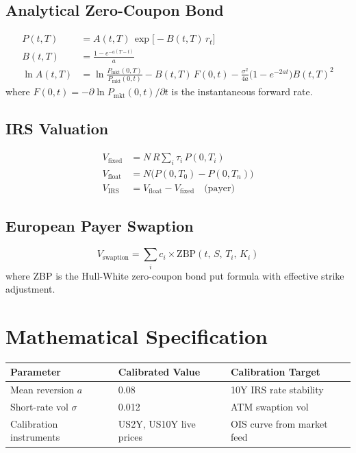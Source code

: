 \documentclass{apex_mdd}
\begin{document}
\subsection{Analytical Zero-Coupon Bond}
\begin{formulabox}
\begin{align*}
  P(t,T) &= A(t,T)\,\exp\!\bigl[-B(t,T)\,r_t\bigr]\\[4pt]
  B(t,T) &= \frac{1 - e^{-a(T-t)}}{a}\\[4pt]
  \ln A(t,T) &= \ln\frac{P_{\mathrm{mkt}}(0,T)}{P_{\mathrm{mkt}}(0,t)} - B(t,T)\,F(0,t) - \frac{\sigma^2}{4a}\bigl(1 - e^{-2at}\bigr)B(t,T)^2
\end{align*}
where $F(0,t) = -\partial\ln P_{\mathrm{mkt}}(0,t)/\partial t$ is the instantaneous forward rate.
\end{formulabox}

\subsection{IRS Valuation}
\begin{formulabox}
\begin{align*}
  V_{\mathrm{fixed}} &= N\,R\sum_i \tau_i\,P(0,T_i)\\
  V_{\mathrm{float}} &= N\bigl(P(0,T_0) - P(0,T_n)\bigr)\\
  V_{\mathrm{IRS}}   &= V_{\mathrm{float}} - V_{\mathrm{fixed}}\quad\text{(payer)}
\end{align*}
\end{formulabox}

\subsection{European Payer Swaption}
\begin{formulabox}
\[
  V_{\mathrm{swaption}} = \sum_i c_i \times \mathrm{ZBP}(t,\,S,\,T_i,\,K_i)
\]
where ZBP is the Hull-White zero-coupon bond put formula with effective strike adjustment.
\end{formulabox}

\section{Mathematical Specification}

\begin{center}
\small
\begin{tabular}{lll}
\toprule
\textbf{Parameter} & \textbf{Calibrated Value} & \textbf{Calibration Target} \\
\midrule
Mean reversion $a$ & 0.08 & 10Y IRS rate stability \\
Short-rate vol $\sigma$ & 0.012 & ATM swaption vol \\
Calibration instruments & US2Y, US10Y live prices & OIS curve from market feed \\
\bottomrule
\end{tabular}
\end{center}
\end{document}
